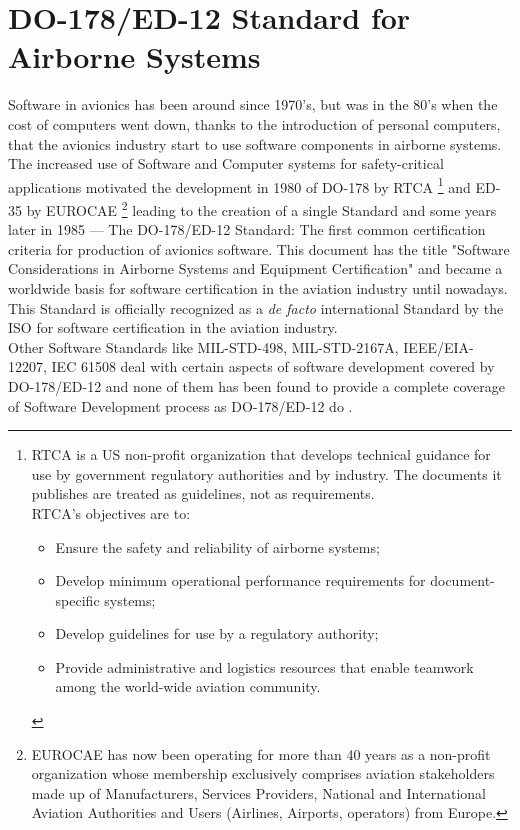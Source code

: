 \section{DO-178/ED-12 Standard for Airborne Systems}\label{sec:airborne}
Software in avionics has been around since 1970's, but was in the 80's when the cost of computers went down, thanks to the introduction of personal computers,
that the avionics industry start to use software components in airborne systems.
The increased use of Software and Computer systems for safety-critical applications motivated the development in 1980 of
DO-178 by \ac{RTCA}
\footnote{
\ac{RTCA} is a US non-profit organization that develops technical guidance for use by government regulatory authorities and by industry.
The documents it publishes are treated as guidelines, not as requirements.\\
\ac{RTCA}'s objectives are to:
\begin{itemize}
\item Ensure the safety and reliability of airborne systems;
\item Develop minimum operational performance requirements for document-specific systems;
\item Develop guidelines for use by a regulatory authority;
\item Provide administrative and logistics resources that enable teamwork among the world-wide aviation community.
\end{itemize}
}
and ED-35 by \ac{EUROCAE}
\footnote{
\ac{EUROCAE} has now been operating for more than 40 years as a non-profit organization
whose membership exclusively comprises aviation stakeholders made up of Manufacturers,
Services Providers, National and International Aviation Authorities and Users (Airlines, Airports, operators) from Europe.
}
leading to the creation of a single Standard and some years later in 1985 --- The DO-178/ED-12 Standard: The first
common certification criteria for production of avionics software. This document has the title
"Software Considerations in Airborne Systems and Equipment Certification" and became a worldwide basis for software
certification in the aviation industry until nowadays. This Standard is
officially recognized as a \textit{de facto} international Standard by the \ac{ISO} for software certification in the aviation industry.\\
Other Software Standards like MIL-STD-498, MIL-STD-2167A, IEEE/EIA-12207, IEC 61508 deal with certain aspects of
software development covered by DO-178/ED-12\cite{ed-12b} and none of them has been found to provide a complete coverage of Software Development process as DO-178/ED-12 do
\cite{avionics}.

